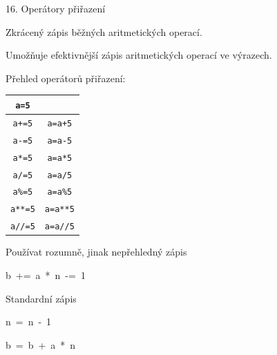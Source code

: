 \documentclass[czech]{beamer}
\providecommand{\tabularnewline}{\\}
\newenvironment{lyxcode}
  {\par\begin{list}{}{
    \setlength{\rightmargin}{\leftmargin}
    \setlength{\listparindent}{0pt}%
    \raggedright
    \setlength{\itemsep}{0pt}
    \setlength{\parsep}{0pt}
    \normalfont\ttfamily}%
   \def\{{\char`\{}
   \def\}{\char`\}}
   \def\textasciitilde{\char`\~}
   \item[]}
  {\end{list}}
\begin{document}
\begin{frame}[plain]{16. Operátory přiřazení}

{\scriptsize Zkrácený zápis běžných aritmetických operací.}{\scriptsize\par}

{\scriptsize Umožňuje efektivnější zápis aritmetických operací ve výrazech.\medskip{}
}{\scriptsize\par}

{\scriptsize Přehled operátorů přiřazení:\medskip{}
}{\scriptsize\par}
\begin{center}
{\scriptsize{}%
\begin{tabular}{|c|c|}
\hline 
{\scriptsize\texttt{a=5}}{\scriptsize{} } & \tabularnewline
\hline 
{\scriptsize\texttt{a+=5}}{\scriptsize{} } & {\scriptsize\texttt{a=a+5}}\tabularnewline
\hline 
{\scriptsize\texttt{a-=5}}{\scriptsize{} } & {\scriptsize\texttt{a=a-5}}\tabularnewline
\hline 
{\scriptsize\texttt{a{*}=5}}{\scriptsize{} } & {\scriptsize\texttt{a=a{*}5}}\tabularnewline
\hline 
{\scriptsize\texttt{a/=5}}{\scriptsize{} } & {\scriptsize\texttt{a=a/5}}\tabularnewline
\hline 
{\scriptsize\texttt{a\%=5}}{\scriptsize{} } & {\scriptsize\texttt{a=a\%5}}\tabularnewline
\hline 
{\scriptsize\texttt{a{*}{*}=5}} & {\scriptsize\texttt{a=a{*}{*}5}}\tabularnewline
\hline 
{\scriptsize\texttt{a//=5}} & {\scriptsize\texttt{a=a//5}}\tabularnewline
\hline 
\end{tabular}}{\scriptsize\par}
\par\end{center}

{\scriptsize Používat rozumně, jinak nepřehledný zápis}{\scriptsize\par}
\begin{lyxcode}
{\scriptsize b~+=~a~{*}~n~-=~1}{\scriptsize\par}
\end{lyxcode}
{\scriptsize Standardní zápis}{\scriptsize\par}
\begin{lyxcode}
{\scriptsize n~=~n~-~1}{\scriptsize\par}

{\scriptsize b~=~b~+~a~{*}~n}{\scriptsize\par}
\end{lyxcode}
\end{frame}
\end{document}
